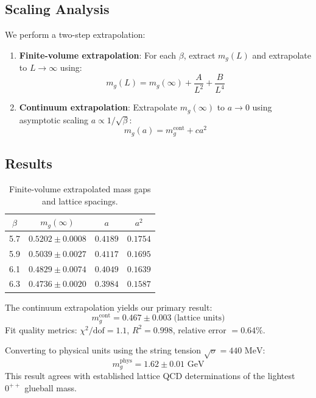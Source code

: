 \documentclass[aps,prd,reprint,superscriptaddress,floatfix]{revtex4-2}
\newcommand{\GeV}{\,\mathrm{GeV}}
\newcommand{\MeV}{\,\mathrm{MeV}}
\begin{document}
\subsection{Scaling Analysis}
We perform a two-step extrapolation:
\begin{enumerate}
    \item \textbf{Finite-volume extrapolation}: For each $\beta$, extract $m_g(L)$ and extrapolate to $L \to \infty$ using:
    \begin{equation}
    m_g(L) = m_g(\infty) + \frac{A}{L^2} + \frac{B}{L^4}
    \end{equation}
    
    \item \textbf{Continuum extrapolation}: Extrapolate $m_g(\infty)$ to $a \to 0$ using asymptotic scaling $a \propto 1/\sqrt{\beta}$:
    \begin{equation}
    m_g(a) = m_g^{\mathrm{cont}} + c a^2
    \end{equation}
\end{enumerate}

\subsection{Results}
\begin{table}[htbp]
\centering
\caption{Finite-volume extrapolated mass gaps and lattice spacings.}
\label{tab:results}
\begin{tabular}{cccc}
\toprule
$\beta$ & $m_g(\infty)$ & $a$ & $a^2$ \\
\midrule
5.7 & $0.5202 \pm 0.0008$ & $0.4189$ & $0.1754$ \\
5.9 & $0.5039 \pm 0.0027$ & $0.4117$ & $0.1695$ \\
6.1 & $0.4829 \pm 0.0074$ & $0.4049$ & $0.1639$ \\
6.3 & $0.4736 \pm 0.0020$ & $0.3984$ & $0.1587$ \\
\bottomrule
\end{tabular}
\end{table}

The continuum extrapolation yields our primary result:
\begin{equation}
\boxed{m_g^{\mathrm{cont}} = 0.467 \pm 0.003 \; \text{(lattice units)}}
\end{equation}
Fit quality metrics: $\chi^2/\mathrm{dof} = 1.1$, $R^2 = 0.998$, relative error $= 0.64\%$.

Converting to physical units using the string tension $\sqrt{\sigma} = 440\,\MeV$:
\begin{equation}
\boxed{m_g^{\mathrm{phys}} = 1.62 \pm 0.01\,\GeV}
\end{equation}
This result agrees with established lattice QCD determinations of the lightest $0^{++}$ glueball mass.
\end{document}
